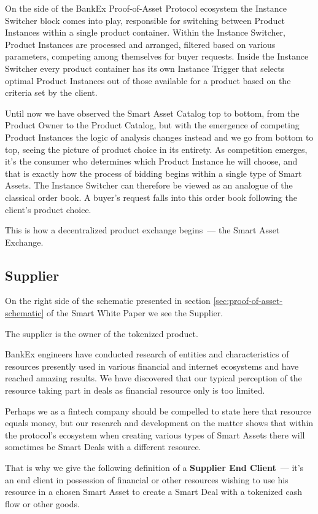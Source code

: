 \documentclass{article}
\begin{document}
\begin{multicols}{2}
On the side of the BankEx Proof-of-Asset Protocol ecosystem the Instance Switcher block comes into play, responsible for switching between Product Instances within a single product container. Within the Instance Switcher, Product Instances are processed and arranged, filtered based on various parameters, competing among themselves for buyer requests. Inside the Instance Switcher every product container has its own Instance Trigger that selects optimal Product Instances out of those available for a product based on the criteria set by the client.

Until now we have observed the Smart Asset Catalog top to bottom, from the Product Owner to the Product Catalog, but with the emergence of competing Product Instances the logic of analysis changes instead and we go from bottom to top, seeing the picture of product choice in its entirety. As competition emerges, it's the consumer who determines which Product Instance he will choose, and that is exactly how the process of bidding begins within a single type of Smart Assets. The Instance Switcher can therefore be viewed as an analogue of the classical order book. A buyer's request falls into this order book following the client’s product choice.

This is how a decentralized product exchange begins~--- the Smart Asset Exchange.

\subsection{Supplier}

On the right side of the schematic presented in section \ref{sec:proof-of-asset-schematic} of the Smart White Paper we see the Supplier.
	
The supplier is the owner of the tokenized product.

BankEx engineers have conducted research of entities and characteristics of resources presently used in various financial and internet ecosystems and have reached amazing results. We have discovered that our typical perception of the resource taking part in deals as financial resource only is too limited.

Perhaps we as a fintech company should be compelled to state here that resource equals money, but our research and development on the matter shows that within the protocol’s ecosystem when creating various types of Smart Assets there will sometimes be Smart Deals with a different resource.

That is why we give the following definition of a \textbf{Supplier End Client}~--- it’s an end client in possession of financial or other resources wishing to use his resource in a chosen Smart Asset to create a Smart Deal with a tokenized cash flow or other goods.


\end{multicols}
\end{document}
